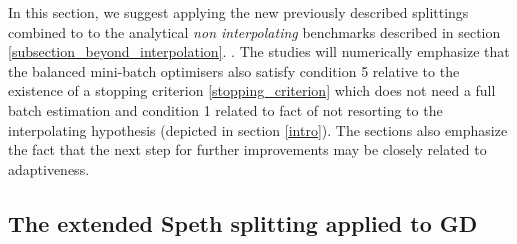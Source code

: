 \documentclass[article,authoryear,jmlmc]{beg_32}             %
\begin{document}
In this section, we suggest applying the new previously described splittings combined to  to the 
analytical {\em non interpolating} benchmarks described in section \ref{subsection_beyond_interpolation}. 
.
The studies will numerically emphasize that the balanced mini-batch optimisers also
satisfy condition 5 relative to the existence of a stopping criterion \eqref{stopping_criterion} which does not need a full batch estimation and condition 1 related to fact of
not resorting to the interpolating hypothesis (depicted in section \ref{intro}). 
The sections also emphasize the fact that the next step for further improvements may be closely related to adaptiveness. 

\subsection{The extended Speth splitting applied to GD}
\label{eSGD}

\end{document}
